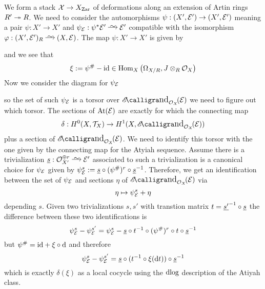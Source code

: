 \documentclass[12pt]{article}
\newcommand{\Zar}{\mathrm{Zar}}
\begin{document}
We form a stack $\X \to X_{\Zar}$ of deformations along an extension of Artin rings $R' \twoheadrightarrow R$. We need to consider the automorphisms $\psi : (X', \mathcal{E}') \to (X', \mathcal{E}')$ meaning a pair $\psi : X' \to X'$ and $\psi_{\E} : \psi^* \E' \iso \E'$ compatible with the isomorphism $\varphi : (X', \E')_{R} \iso (X, \E)$. The map $\psi : X' \to X'$ is given by 
\begin{center}
\end{center}
and we see that
\[ \xi := \psi^{\#} - \mathrm{id} \in \mathrm{Hom}_{X} \left( \Omega_{X/R}, J \otimes_R \mathcal{O}_{X} \right) \]
Now we consider the diagram for $\psi_{\mathcal{E}}$
\begin{center}
\end{center}
so the set of such $\psi_{\mathcal{E}}$ is a torsor over $\shEnd{\struct{X}}{\E}$ we need to figure out which torsor. The sections of $\mathrm{At}(\mathcal{E})$ are exactly for which the connecting map
\[ \delta : H^0(X, \T_X) \to H^1(X, \shEnd{\struct{X}}{\E}) \]
plus a section of $\shEnd{\struct{X}}{\E}$. We need to identify this torsor with the one given by the connecting map for the Atyiah sequence. Assume there is a trivialization $\ul{s} : \struct{X'}^{\oplus r} \iso \E'$ associated to such a trivialization is a canonical choice for $\psi_{\mathcal{E}}$ given by $\psi_{\mathcal{E}}^{s} := \underline{s} \circ (\psi^{\#})^{r} \circ \underline{s}^{-1}$. Therefore, we get an identification between the set of $\psi_{\mathcal{E}}$ and sections $\eta$ of $\shEnd{\struct{X}}{\E}$ via
\[ \eta \mapsto \psi_{\mathcal{E}}^s + \eta \]
depending $s$. Given two trivializations $s, s'$ with transtion matrix $t = \underline{s'}^{-1} \circ \underline{s}$ the difference between these two identifications is 
\[ \psi_{\mathcal{E}}^{s} - \psi_{\mathcal{E}}^{s'} = \psi_{\mathcal{E}}^{s} - \underline{s} \circ t^{-1} \circ (\psi^{\#})^r \circ t \circ \underline{s}^{-1}  \]
but $\psi^{\#} = \mathrm{id} + \xi \circ \mathrm{d}$ and therefore
\[ \psi_{\mathcal{E}}^{s} - \psi_{\mathcal{E}}^{s'} = \underline{s} \circ (t^{-1} \circ \xi(\mathrm{d}{t})) \circ \underline{s}^{-1} \]
which is exactly $\delta(\xi)$ as a local cocycle using the $\mathrm{d}{\log}$ description of the Atiyah class. 
\end{document}
